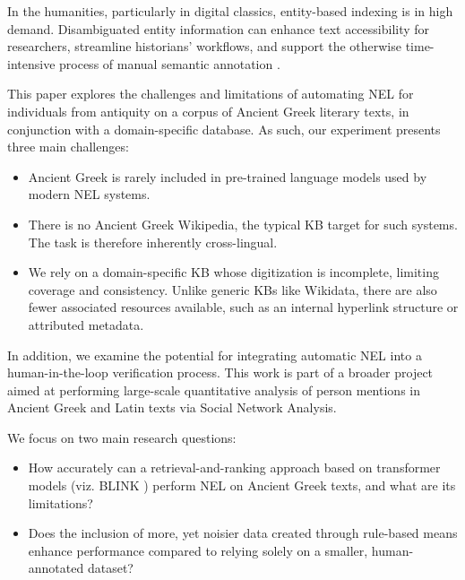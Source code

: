 \documentclass[final]{anthology-ch}
\begin{document}
In the humanities, particularly in digital classics, entity-based indexing is in high demand. Disambiguated entity information can enhance text accessibility for researchers, streamline historians’ workflows, and support the otherwise time-intensive process of manual semantic annotation \cite{Ehrmann_Hamdi_Pontes_Romanello_Doucet_2021}.

This paper explores the challenges and limitations of automating NEL for individuals from antiquity on a corpus of Ancient Greek literary texts, in conjunction with a domain-specific database. As such, our experiment presents three main challenges:

\begin{itemize}
\item Ancient Greek is rarely included in pre-trained language models used by modern NEL systems.
\item There is no Ancient Greek Wikipedia, the typical KB target for such systems. The task is therefore inherently cross-lingual.
\item We rely on a domain-specific KB whose digitization is incomplete, limiting coverage and consistency. Unlike generic KBs like Wikidata, there are also fewer associated resources available, such as an internal hyperlink structure or attributed metadata.
\end{itemize}

In addition, we examine the potential for integrating automatic NEL into a human-in-the-loop verification process. This work is part of a broader project aimed at performing large-scale quantitative analysis of person mentions in Ancient Greek and Latin texts via Social Network Analysis.

We focus on two main research questions:

\begin{itemize}
\item How accurately can a retrieval-and-ranking approach based on transformer models (viz. BLINK \cite{Wu_Petroni_Josifoski_Riedel_Zettlemoyer_2020}) perform NEL on Ancient Greek texts, and what are its limitations?
\item Does the inclusion of more, yet noisier data created through rule-based means enhance performance compared to relying solely on a smaller, human-annotated dataset?
\end{itemize}
\end{document}
